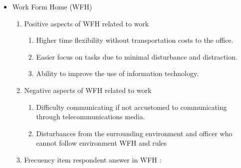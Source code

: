 \documentclass[conference]{IEEEtran}
\begin{document}
\begin{itemize}
\item {Work Form Home (WFH) }
\begin{enumerate}
\item{Positive aspects of WFH related to work}
\begin{enumerate}
\item Higher time flexibility without transportation costs to the office.
\item Easier focus on tasks due to minimal disturbance and distraction.
\item Ability to improve the use of information technology.
\end{enumerate}
\item{Negative aspects of WFH related to work}
\begin{enumerate}
\item Difficulty communicating if not accustomed to communicating through telecommunications media.
\item Disturbances from the surrounding environment and officer who cannot follow environment WFH and rules
\end{enumerate}
\item Frecuency item respondent answer in WFH :



\end{enumerate}
\end{itemize}
\end{document}
